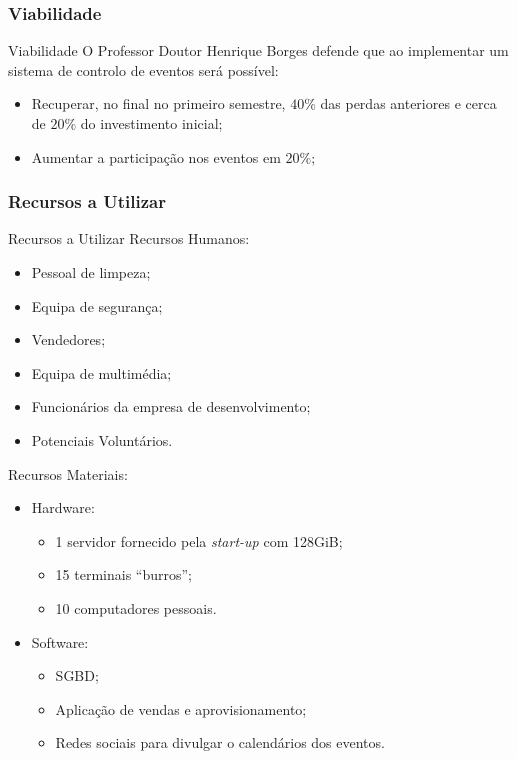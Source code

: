 \documentclass[compress,svgnames,handout,13.7pt]{beamer}
\begin{document}
\subsubsection{Viabilidade}
\begin{frame}{Viabilidade}
O Professor Doutor Henrique Borges defende que ao implementar um sistema de controlo de eventos
        será possível: 
        \begin{itemize}
          \item Recuperar, no final no primeiro semestre, $40\%$ das perdas anteriores e cerca de $20\%$
            do investimento inicial;
          \item Aumentar a participação nos eventos em $20\%$;
        \end{itemize}
\end{frame}

\subsubsection{Recursos a Utilizar}
\begin{frame}{Recursos a Utilizar}
Recursos Humanos:
\begin{itemize}
               \item Pessoal de limpeza;
               \item Equipa de seguran\c{c}a;
               \item Vendedores;
               \item Equipa de multim\'edia;
               \item Funcion\'{a}rios da empresa de desenvolvimento;
               \item Potenciais Volunt\'arios.
             \end{itemize}
Recursos Materiais:
\begin{itemize}
             \item{Hardware:}
               \begin{itemize}
                 \item 1 servidor fornecido pela \textit{start-up} com 128GiB;
                 \item 15 terminais ``burros'';
                 \item 10 computadores pessoais.
               \end{itemize}
             \item{Software:}
               \begin{itemize}
                 \item SGBD;
                 \item Aplicação de vendas e aprovisionamento;
                 \item Redes sociais para divulgar o calendários dos eventos.
               \end{itemize}
             \end{itemize}
\end{frame}
\end{document}
